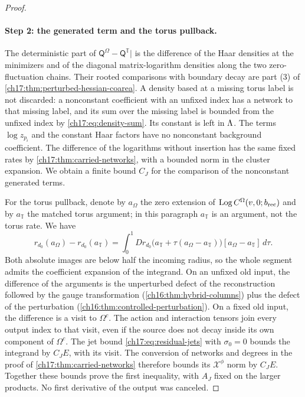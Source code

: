 \begin{proof}
\paragraph{Step 2: the generated term and the torus pullback.}
The deterministic part of $\mathsf Q^\Omega-\mathsf Q^{\mathbb T}|$ is the difference of the Haar densities at the minimizers and of the diagonal matrix-logarithm densities along the two zero-fluctuation chains. Their rooted comparisons with boundary decay are part (3) of \cref{ch17:thm:perturbed-hessian-coarea}. A density based at a missing torus label is not discarded: a nonconstant coefficient with an unfixed index has a network to that missing label, and its sum over the missing label is bounded from the unfixed index by \eqref{ch17:eq:density-sum}. Its constant is left in $\Lambda$. The terms $\log z_{p_i}$ and the constant Haar factors have no nonconstant background coefficient. The difference of the logarithms without insertion has the same fixed rates by \cref{ch17:thm:carried-networks}, with a bounded norm in the cluster expansion. We obtain a finite bound $C_J$ for the comparison of the nonconstant generated terms.

For the torus pullback, denote by $a_\Omega$ the zero extension of $\operatorname{Log} C^\Omega(v,0;b_{\mathrm{rec}})$ and by $a_{\mathbb T}$ the matched torus argument; in this paragraph $a_{\mathbb T}$ is an argument, not the torus rate. We have
\begin{equation}\label{ch17:eq:principal-torus-difference}
 r_{d_0}(a_\Omega)-r_{d_0}(a_{\mathbb T})=\int_0^1Dr_{d_0}\bigl(a_{\mathbb T}+\tau(a_\Omega-a_{\mathbb T})\bigr)[a_\Omega-a_{\mathbb T}]\,d\tau.
\end{equation}
Both absolute images are below half the incoming radius, so the whole segment admits the coefficient expansion of the integrand. On an unfixed old input, the difference of the arguments is the unperturbed defect of the reconstruction followed by the gauge transformation (\cref{ch16:thm:hybrid-columns}) plus the defect of the perturbation (\cref{ch16:thm:controlled-perturbation}). On a fixed old input, the difference is a visit to $\Omega^c$. The action and interaction tensors join every output index to that visit, even if the source does not decay inside its own component of $\Omega^c$. The jet bound \eqref{ch17:eq:residual-jets} with $\sigma_0=0$ bounds the integrand by $C_JE$, with its visit. The conversion of networks and degrees in the proof of \cref{ch17:thm:carried-networks} therefore bounds its $\mathcal X^\phi$ norm by $C_JE$. Together these bounds prove the first inequality, with $A_J$ fixed on the larger products. No first derivative of the output was canceled.


\end{proof}
